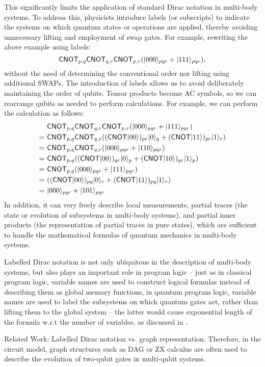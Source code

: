 This significantly limits the application of standard Dirac notation in multi-body systems. To address this, physicists introduce labels (or subscripts) to indicate the systems on which quantum states or operations are applied, thereby avoiding unnecessary lifting and employment of swap gates. For example, rewriting the above example using labels:
$${\mathsf{CNOT}}_{p,q}{\mathsf{CNOT}}_{q,r}{\mathsf{CNOT}}_{p,r}(|000\rangle_{pqr}+|111\rangle_{pqr}),$$
without the need of determining the conventional order nor lifting using additional SWAPs. 
The introduction of labels allows us to avoid deliberately maintaining the order of qubits. Tensor products become AC symbols, so we can rearrange qubits as needed to perform calculations. For example, we can perform the calculation as follows:
\begin{align*}
  &{\mathsf{CNOT}}_{p,q}{\mathsf{CNOT}}_{q,r}{\mathsf{CNOT}}_{p,r}(|000\rangle_{pqr}+|111\rangle_{pqr}) \\
  =\ &{\mathsf{CNOT}}_{p,q}{\mathsf{CNOT}}_{q,r}(({\mathsf{CNOT}}|00\rangle)_{pr}|0\rangle_q + ({\mathsf{CNOT}}|11\rangle)_{pr}|1\rangle_r) \\
  =\ &{\mathsf{CNOT}}_{p,q}{\mathsf{CNOT}}_{q,r}(|000\rangle_{pqr} + |110\rangle_{pqr}) \\
  =\ &{\mathsf{CNOT}}_{p,q}(({\mathsf{CNOT}}|00\rangle)_{qr}|0\rangle_p + ({\mathsf{CNOT}}|10\rangle)_{qr}|1\rangle_p) \\
  =\ &{\mathsf{CNOT}}_{p,q}(|000\rangle_{pqr} + |111\rangle_{pqr}) \\
  =\ &(({\mathsf{CNOT}}|00\rangle)_{pq}|0\rangle_r + ({\mathsf{CNOT}}|11\rangle)_{pq}|1\rangle_r) \\
  =\ &|000\rangle_{pqr} + |101\rangle_{pqr}
\end{align*}
In addition, it can very freely describe local measurements, partial traces (the state or evolution of subsystems in multi-body systems), and partial inner products (the representation of partial traces in pure states), which are sufficient to handle the mathematical formulas of quantum mechanics in multi-body systems.

Labelled Dirac notation is not only ubiquitous in the description of multi-body systems, but also plays an important role in program logic -- just as in classical program logic, variable names are used to construct logical formulas instead of describing them as global memory functions, in quantum program logic, variable names are used to label the subsystems on which quantum gates act, rather than lifting them to the global system -- the latter would cause exponential length of the formula w.r.t the number of variables, as discussed in \cite{}.

Related Work:
Labelled Dirac notation vs. graph representation.
Therefore, in the circuit model, graph structures such as DAG or ZX calculus are often used to describe the evolution of two-qubit gates in multi-qubit systems.


